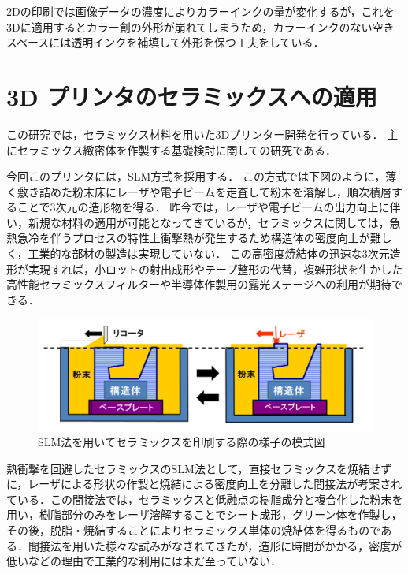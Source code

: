 2Dの印刷では画像データの濃度によりカラーインクの量が変化するが，これを3Dに適用するとカラー創の外形が崩れてしまうため，カラーインクのない空きスペースには透明インクを補填して外形を保つ工夫をしている．

\section{3D プリンタのセラミックスへの適用\cite{g}}
\label{sec:enum}
この研究では，セラミックス材料を用いた3Dプリンター開発を行っている．
主にセラミックス緻密体を作製する基礎検討に関しての研究である．

今回このプリンタには，SLM方式を採用する．
この方式では下図のように，薄く敷き詰めた粉末床にレーザや電子ビームを走査して粉末を溶解し，順次積層することで3次元の造形物を得る．
昨今では，レーザや電子ビームの出力向上に伴い，新規な材料の適用が可能となってきているが，セラミックスに関しては，急熱急冷を伴うプロセスの特性上衝撃熱が発生するため構造体の密度向上が難しく，工業的な部材の製造は実現していない．
この高密度焼結体の迅速な3次元造形が実現すれば，小ロットの射出成形やテープ整形の代替，複雑形状を生かした高性能セラミックスフィルターや半導体作製用の露光ステージへの利用が期待できる．

\begin{figure}[H]
  \centering
  \includegraphics[width=14truecm]{./fig/seramikku1.png}
  \caption{SLM法を用いてセラミックスを印刷する際の様子の模式図}
  \label{fig:ferret}
\end{figure}

熱衝撃を回避したセラミックスのSLM法として，直接セラミックスを焼結せずに，レーザによる形状の作製と焼結による密度向上を分離した間接法が考案されている．この間接法では，セラミックスと低融点の樹脂成分と複合化した粉末を用い，樹脂部分のみをレーザ溶解することでシート成形，グリーン体を作製し，その後，脱脂・焼結することによりセラミックス単体の焼結体を得るものである．間接法を用いた様々な試みがなされてきたが，造形に時間がかかる，密度が低いなどの理由で工業的な利用には未だ至っていない．

